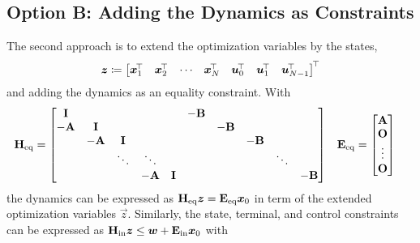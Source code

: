 		\subsection{Option B: Adding the Dynamics as Constraints}
			The second approach is to extend the optimization variables by the states,
			\begin{equation}
				\bm{z} \coloneqq \begin{bmatrix} \bm{x}_1^{\!\top} & \bm{x}_2^{\!\top} & \cdots & \bm{x}_N^{\!\top} & \bm{u}_0^{\!\top} & \bm{u}_1^{\!\top} & \bm{u}_{N - 1}^{\!\top} \end{bmatrix}^{\!\top}
			\end{equation}
			and adding the dynamics as an equality constraint. With
			\begin{align}
				\bm{\mathrm{H}}_\mathrm{eq} &=
					\begin{bmatrix}
						\bm{\mathrm{I}}  &          &         &          &         & -\bm{\mathrm{B}} &          &          &        &          \\
						-\bm{\mathrm{A}} & \bm{\mathrm{I}}  &         &          &         &          & -\bm{\mathrm{B}} &          &        &          \\
						         & -\bm{\mathrm{A}} & \bm{\mathrm{I}} &          &         &          &          & -\bm{\mathrm{B}} &        &          \\
						         &          & \ddots  & \ddots   &         &          &          &          & \ddots &          \\
						         &          &         & -\bm{\mathrm{A}} & \bm{\mathrm{I}} &          &          &          &        & -\bm{\mathrm{B}}
					\end{bmatrix} &
				\bm{\mathrm{E}}_\mathrm{eq} &=
					\begin{bmatrix}
						\bm{\mathrm{A}} \\
						\bm{\mathrm{O}} \\
						\vdots \\
						\bm{\mathrm{O}}
					\end{bmatrix}
			\end{align}
			the dynamics can be expressed as \( \bm{\mathrm{H}}_\mathrm{eq} \bm{z} = \bm{\mathrm{E}}_\mathrm{eq} \bm{x}_0 \) in term of the extended optimization variables \(\vec{z}\). Similarly, the state, terminal, and control constraints can be expressed as \( \bm{\mathrm{H}}_\mathrm{in} \bm{z} \leq \bm{w} + \bm{\mathrm{E}}_\mathrm{in} \bm{x}_0 \) with
